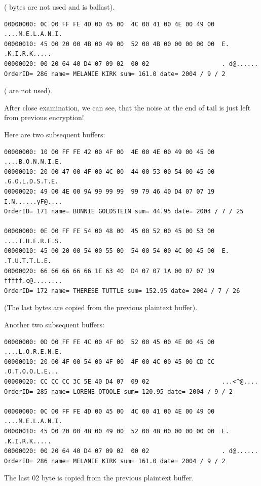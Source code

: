 ( bytes are not used and is ballast).

\begin{lstlisting}
00000000: 0C 00 FF FE 4D 00 45 00  4C 00 41 00 4E 00 49 00  ....M.E.L.A.N.I.
00000010: 45 00 20 00 4B 00 49 00  52 00 4B 00 00 00 00 00  E. .K.I.R.K.....
00000020: 00 20 64 40 D4 07 09 02  00 02                    . d@......
OrderID= 286 name= MELANIE KIRK sum= 161.0 date= 2004 / 9 / 2
\end{lstlisting}

( are not used).

After close examination, we can see, that the noise at the end of tail is just left
from previous encryption!

Here are two subsequent buffers:

\begin{lstlisting}
00000000: 10 00 FF FE 42 00 4F 00  4E 00 4E 00 49 00 45 00  ....B.O.N.N.I.E.
00000010: 20 00 47 00 4F 00 4C 00  44 00 53 00 54 00 45 00   .G.O.L.D.S.T.E.
00000020: 49 00 4E 00 9A 99 99 99  99 79 46 40 D4 07 07 19  I.N......yF@....
OrderID= 171 name= BONNIE GOLDSTEIN sum= 44.95 date= 2004 / 7 / 25

00000000: 0E 00 FF FE 54 00 48 00  45 00 52 00 45 00 53 00  ....T.H.E.R.E.S.
00000010: 45 00 20 00 54 00 55 00  54 00 54 00 4C 00 45 00  E. .T.U.T.T.L.E.
00000020: 66 66 66 66 66 1E 63 40  D4 07 07 1A 00 07 07 19  fffff.c@........
OrderID= 172 name= THERESE TUTTLE sum= 152.95 date= 2004 / 7 / 26
\end{lstlisting}

(The last  bytes are copied from the previous plaintext buffer).

Another two subsequent buffers:

\begin{lstlisting}
00000000: 0D 00 FF FE 4C 00 4F 00  52 00 45 00 4E 00 45 00  ....L.O.R.E.N.E.
00000010: 20 00 4F 00 54 00 4F 00  4F 00 4C 00 45 00 CD CC   .O.T.O.O.L.E...
00000020: CC CC CC 3C 5E 40 D4 07  09 02                    ...<^@....
OrderID= 285 name= LORENE OTOOLE sum= 120.95 date= 2004 / 9 / 2

00000000: 0C 00 FF FE 4D 00 45 00  4C 00 41 00 4E 00 49 00  ....M.E.L.A.N.I.
00000010: 45 00 20 00 4B 00 49 00  52 00 4B 00 00 00 00 00  E. .K.I.R.K.....
00000020: 00 20 64 40 D4 07 09 02  00 02                    . d@......
OrderID= 286 name= MELANIE KIRK sum= 161.0 date= 2004 / 9 / 2
\end{lstlisting}

The last 02 byte is copied from the previous plaintext buffer.


